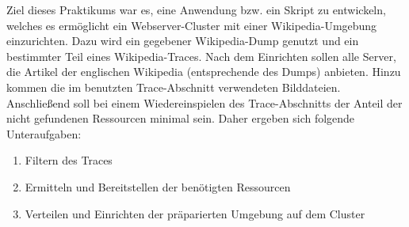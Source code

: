 Ziel dieses Praktikums war es, eine Anwendung bzw. ein Skript zu entwickeln, welches es ermöglicht ein Webserver-Cluster mit einer Wikipedia-Umgebung einzurichten. Dazu wird ein gegebener Wikipedia-Dump genutzt und ein bestimmter Teil eines Wikipedia-Traces. Nach dem Einrichten sollen alle Server, die Artikel der englischen Wikipedia (entsprechende des Dumps) anbieten. Hinzu kommen die im benutzten Trace-Abschnitt verwendeten Bilddateien. Anschließend soll bei einem Wiedereinspielen des Trace-Abschnitts der Anteil der nicht gefundenen Ressourcen minimal sein. Daher ergeben sich folgende Unteraufgaben:
\begin{enumerate}
\item Filtern des Traces
\item Ermitteln und Bereitstellen der benötigten Ressourcen
\item Verteilen und Einrichten der präparierten Umgebung auf dem Cluster
\end{enumerate}

